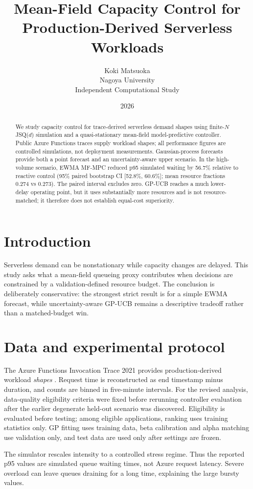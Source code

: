 \documentclass[10pt]{article}
\title{Mean-Field Capacity Control for Production-Derived Serverless Workloads}
\author{Koki Matsuoka\\Nagoya University\\Independent Computational Study}
\date{2026}
\begin{document}
\maketitle
\begin{abstract}
We study capacity control for trace-derived serverless demand shapes using finite-$N$ JSQ($d$) simulation and a quasi-stationary mean-field model-predictive controller. Public Azure Functions traces supply workload shapes; all performance figures are controlled simulations, not deployment measurements. Gaussian-process forecasts provide both a point forecast and an uncertainty-aware upper scenario. In the high-volume scenario, EWMA MF-MPC reduced p95 simulated waiting by 56.7\% relative to reactive control (95\% paired bootstrap CI [52.8\%, 60.6\%]; mean resource fractions 0.274 vs 0.273). The paired interval excludes zero. GP-UCB reaches a much lower-delay operating point, but it uses substantially more resources and is not resource-matched; it therefore does not establish equal-cost superiority.
\end{abstract}
\section{Introduction}
Serverless demand can be nonstationary while capacity changes are delayed. This study asks what a mean-field queueing proxy contributes when decisions are constrained by a validation-defined resource budget. The conclusion is deliberately conservative: the strongest strict result is for a simple EWMA forecast, while uncertainty-aware GP-UCB remains a descriptive tradeoff rather than a matched-budget win.
\section{Data and experimental protocol}
The Azure Functions Invocation Trace 2021 provides production-derived workload \emph{shapes} \cite{azuretrace2021}. Request time is reconstructed as end timestamp minus duration, and counts are binned in five-minute intervals. For the revised analysis, data-quality eligibility criteria were fixed before rerunning controller evaluation after the earlier degenerate held-out scenario was discovered. Eligibility is evaluated before testing; among eligible applications, ranking uses training statistics only. GP fitting uses training data, beta calibration and alpha matching use validation only, and test data are used only after settings are frozen.

The simulator rescales intensity to a controlled stress regime. Thus the reported p95 values are simulated queue waiting times, not Azure request latency. Severe overload can leave queues draining for a long time, explaining the large bursty values.
\end{document}
